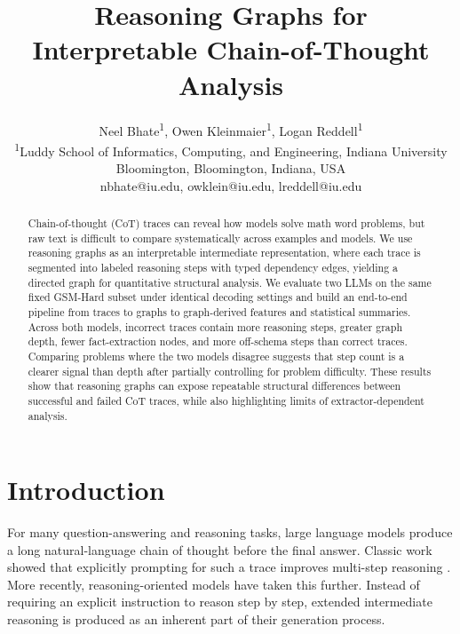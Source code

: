 \documentclass[letterpaper]{article}
\title{Reasoning Graphs for\\Interpretable Chain-of-Thought Analysis}
\author{
    Neel Bhate\textsuperscript{\rm 1},
    Owen Kleinmaier\textsuperscript{\rm 1},
    Logan Reddell\textsuperscript{\rm 1}\\
    \textsuperscript{\rm 1}Luddy School of Informatics, Computing, and Engineering, Indiana University Bloomington, Bloomington, Indiana, USA\\
    nbhate@iu.edu, owklein@iu.edu, lreddell@iu.edu
}
\begin{document}
\maketitle


\begin{abstract}
Chain-of-thought (CoT) traces can reveal how models solve math word problems, but raw text is difficult to compare systematically across examples and models. We use reasoning graphs as an interpretable intermediate representation, where each trace is segmented into labeled reasoning steps with typed dependency edges, yielding a directed graph for quantitative structural analysis. We evaluate two LLMs on the same fixed GSM-Hard subset under identical decoding settings and build an end-to-end pipeline from traces to graphs to graph-derived features and statistical summaries. Across both models, incorrect traces contain more reasoning steps, greater graph depth, fewer fact-extraction nodes, and more off-schema steps than correct traces. Comparing problems where the two models disagree suggests that step count is a clearer signal than depth after partially controlling for problem difficulty. These results show that reasoning graphs can expose repeatable structural differences between successful and failed CoT traces, while also highlighting limits of extractor-dependent analysis.
\end{abstract}


\section{Introduction}

For many question-answering and reasoning tasks, large language models produce a long natural-language chain of thought before the final answer. Classic work showed that explicitly prompting for such a trace improves multi-step reasoning \cite{wei2022chainofthought}. More recently, reasoning-oriented models have taken this further. Instead of requiring an explicit instruction to reason step by step, extended intermediate reasoning is produced as an inherent part of their generation process.
\end{document}
